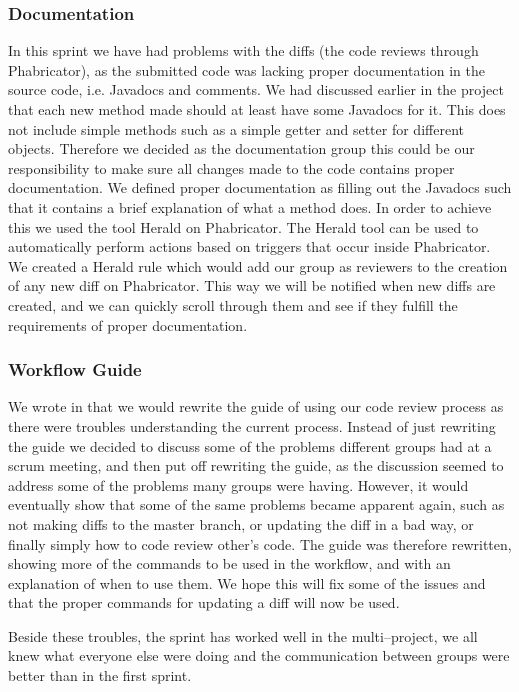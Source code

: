 \subsubsection{Documentation}
In this sprint we have had problems with the diffs (the code reviews through Phabricator), as the submitted code was lacking proper documentation in the source code, i.e. Javadocs and comments.
We had discussed earlier in the project that each new method made should at least have some Javadocs for it.
This does not include simple methods such as a simple getter and setter for different objects.
Therefore we decided as the documentation group this could be our responsibility to make sure all changes made to the code contains proper documentation.
We defined proper documentation as filling out the Javadocs such that it contains a brief explanation of what a method does.
In order to achieve this we used the tool Herald on Phabricator.
The Herald tool can be used to automatically perform actions based on triggers that occur inside Phabricator.
We created a Herald rule which would add our group as reviewers to the creation of any new diff on Phabricator.
This way we will be notified when new diffs are created, and we can quickly scroll through them and see if they fulfill the requirements of proper documentation.

\subsubsection{Workflow Guide}
We wrote in  that we would rewrite the guide of using our code review process as there were troubles understanding the current process.
Instead of just rewriting the guide we decided to discuss some of the problems different groups had at a scrum meeting, and then put off rewriting the guide, as the discussion seemed to address some of the problems many groups were having.
However, it would eventually show that some of the same problems became apparent again, such as not making diffs to the master branch, or updating the diff in a bad way, or finally simply how to code review other's code.
The guide was therefore rewritten, showing more of the commands to be used in the workflow, and with an explanation of when to use them.
We hope this will fix some of the issues and that the proper commands for updating a diff will now be used.

Beside these troubles, the sprint has worked well in the multi--project, we all knew what everyone else were doing and the communication between groups were better than in the first sprint.

